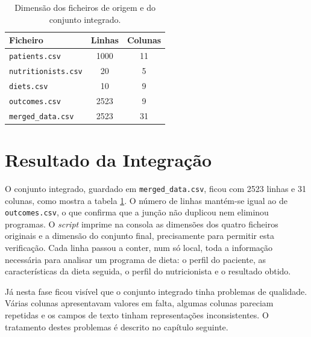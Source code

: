 \begin{table}[h]
\centering
\begin{tabular}{|l|c|c|}
\hline
\textbf{Ficheiro} & \textbf{Linhas} & \textbf{Colunas} \\
\hline
\texttt{patients.csv} & 1000 & 11 \\
\texttt{nutritionists.csv} & 20 & 5 \\
\texttt{diets.csv} & 10 & 9 \\
\texttt{outcomes.csv} & 2523 & 9 \\
\hline
\texttt{merged\_data.csv} & 2523 & 31 \\
\hline
\end{tabular}
\caption{Dimensão dos ficheiros de origem e do conjunto integrado.}
\label{tab:ficheiros}
\end{table}

\section{Resultado da Integração}
O conjunto integrado, guardado em \texttt{merged\_data.csv}, ficou com 2523 linhas e 31 colunas, como mostra a tabela \ref{tab:ficheiros}. O número de linhas mantém-se igual ao de \texttt{outcomes.csv}, o que confirma que a junção não duplicou nem eliminou programas. O \textit{script} imprime na consola as dimensões dos quatro ficheiros originais e a dimensão do conjunto final, precisamente para permitir esta verificação. Cada linha passou a conter, num só local, toda a informação necessária para analisar um programa de dieta: o perfil do paciente, as características da dieta seguida, o perfil do nutricionista e o resultado obtido.

Já nesta fase ficou visível que o conjunto integrado tinha problemas de qualidade. Várias colunas apresentavam valores em falta, algumas colunas pareciam repetidas e os campos de texto tinham representações inconsistentes. O tratamento destes problemas é descrito no capítulo seguinte.
